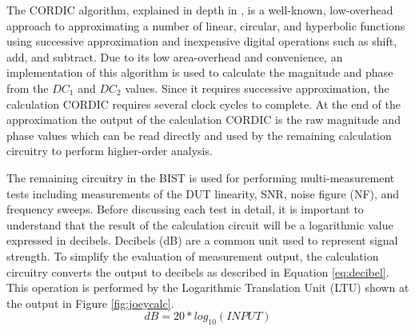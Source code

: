 \documentclass[12pt]{report}
\begin{document}
The CORDIC algorithm, explained in depth in \cite{joey}, is a well-known, low-overhead approach to approximating a number of linear, circular, and hyperbolic functions using successive approximation and inexpensive digital operations such as shift, add, and subtract.  Due to its low area-overhead and convenience, an implementation of this algorithm is used to calculate the magnitude and phase from the $DC_1$ and $DC_2$ values\cite{joey}.  Since it requires successive approximation, the calculation CORDIC requires several clock cycles to complete.  At the end of the approximation the output of the calculation CORDIC is the raw magnitude and phase values which can be read directly and used by the remaining calculation circuitry to perform higher-order analysis\cite{joey}.

The remaining circuitry in the BIST is used for performing multi-measurement tests including measurements of the DUT linearity, SNR, noise figure (NF), and frequency sweeps. Before discussing each test in detail, it is important to understand that the result of the calculation circuit will be a logarithmic value expressed in decibels.  Decibels (dB) are a common unit used to represent signal strength.  To simplify the evaluation of measurement output, the calculation circuitry converts the output to decibels as described in Equation \ref{eq:decibel}\cite{joey}.  This operation is performed by the Logarithmic Translation Unit (LTU) shown at the output in Figure \ref{fig:joeycalc}.  
\begin{equation}
dB = 20 * log_{10}(INPUT)
\label{eq:decibel}
\end{equation}
\end{document}
